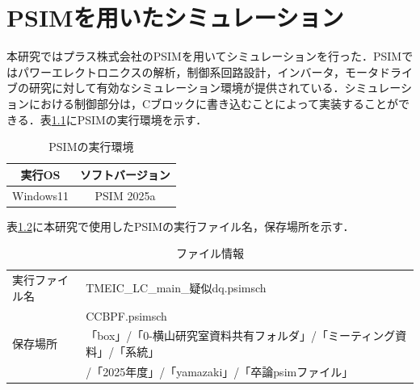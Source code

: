 

\chapter{PSIMを用いたシミュレーション}
\thispagestyle{fancy}
\label{chap:MATLAB}
本研究ではプラス株式会社のPSIMを用いてシミュレーションを行った．PSIMではパワーエレクトロニクスの解析，制御系回路設計，インバータ，モータドライブの研究に対して有効なシミュレーション環境が提供されている．シミュレーションにおける制御部分は，Cブロックに書き込むことによって実装することができる．表\ref{tabA.1}にPSIMの実行環境を示す．

\begin{table}[H]
    \centering
    \caption{PSIMの実行環境}
    \label{tabA.1}
    \small
    \begin{tabular}{c|c} \hline \hline
        実行OS    &   ソフトバージョン    \\ \hline
        Windows11    & PSIM 2025a   \\ \hline
    \end{tabular}
\end{table}

表\ref{tabA.2}に本研究で使用したPSIMの実行ファイル名，保存場所を示す．

\begin{table}[H]
    \centering
    \caption{ファイル情報}
    \label{tabA.2}
    \small
    \begin{tabular}{l|l} \hline \hline
        実行ファイル名  & TMEIC\_LC\_main\_疑似dq.psimsch \\
                        & CCBPF.psimsch \\ \hline
        保存場所        & 「box」/「0-横山研究室資料共有フォルダ」/「ミーティング資料」/「系統」\\
                        & /「2025年度」/「yamazaki」/「卒論psimファイル」 \\ \hline
    \end{tabular}
\end{table}

